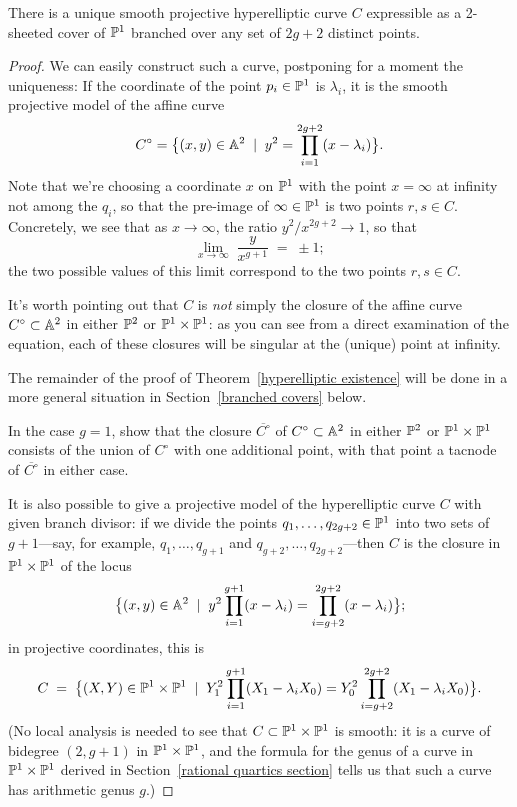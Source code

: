  
\begin{theorem}\label{hyperelliptic existence}
There is a unique smooth projective hyperelliptic curve $C$ expressible as a 2-sheeted cover of $\PP^1$ branched over any set of $2g+2$ distinct points.
\end{theorem}

\begin{proof} 
We can easily construct such a curve, postponing for a moment the uniqueness:
If the coordinate of the point $p_i \in \PP^1$ is $\lambda_i$, it is the smooth projective model of the affine curve 
  $$
C^\circ = \big\{ (x,y) \in \AA^2 \; \mid \; y^2 = \prod_{i=1}^{2g+2} (x - \lambda_i) \big\}.
$$ 
Note that we're choosing a coordinate $x$ on $\PP^1$ with the point $x = \infty$ at infinity not among the $q_i$, so that the pre-image of $\infty \in \PP^1$ is two points $r, s \in C$. Concretely, we see that as $x \to \infty$, the ratio $y^2/x^{2g+2} \to 1$, so that 
$$
\lim_{x \to \infty} \; \frac{y}{x^{g+1}} \; = \; \pm 1;
$$
  the two possible values of this limit correspond to the two points $r,s \in C$.
  
  It's worth pointing out that $C$ is \emph{not} simply the closure of the affine curve $C^\circ \subset \AA^2$ in either $\PP^2$ or $\PP^1 \times \PP^1$: as you can see from a direct examination of the equation, each of these closures will be singular at the (unique) point at infinity.
  
   The remainder of the proof of Theorem~\ref{hyperelliptic existence} will be done in a more general situation in Section~\ref{branched covers} below.
   
 \begin{exercise}
  In the case $g=1$, show that the closure $\overline{C^\circ}$ of $C^\circ \subset \AA^2$ in either $\PP^2$ or $\PP^1 \times \PP^1$ consists of the union of $C^\circ$ with one additional point, with that point a tacnode of $\overline{C^\circ}$ in either case.
  \end{exercise}
  
It is also possible to give a projective model of the hyperelliptic curve $C$ with given branch divisor: if we divide the points $q_1,\dots,q_{2g+2} \in \PP^1$ into two sets of $g+1$---say, for example, $q_1,\dots,q_{g+1}$ and $q_{g+2}, \dots, q_{2g+2}$---then $C$ is the closure in $\PP^1 \times \PP^1$ of the  locus
  $$
  \big\{ (x,y) \in \AA^2 \; \mid \; y^2\prod_{i=1}^{g+1} (x - \lambda_i) = \prod_{i=g+2}^{2g+2} (x - \lambda_i) \big\};
  $$
  in projective coordinates, this is
   $$
  C \; = \; \big\{ (X,Y) \in \PP^1 \times \PP^1 \; \mid \; Y_1^2\prod_{i=1}^{g+1} (X_1 - \lambda_iX_0) = Y_0^2\prod_{i=g+2}^{2g+2} (X_1 - \lambda_iX_0) \big\}.
  $$
  (No local analysis is needed to see that $C \subset \PP^1 \times \PP^1$ is smooth: it is a curve of bidegree $(2,g+1)$ in $\PP^1 \times \PP^1$, and the formula for the genus of a curve in $\PP^1 \times \PP^1$ derived in Section~\ref{rational quartics section} tells us that such a curve has arithmetic genus $g$.)
  

\end{proof}
